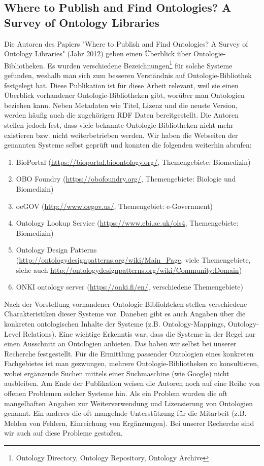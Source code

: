 \documentclass{article}
\begin{document}
\subsection{Where to Publish and Find Ontologies? A Survey of Ontology Libraries}

Die Autoren des Papiers "Where to Publish and Find Ontologies? A Survey of Ontology Libraries" \cite{d2012publish} (Jahr 2012) geben einen Überblick über Ontologie-Bibliotheken.
Es wurden verschiedene Bezeichnungen\footnote{Ontology Directory, Ontology Repository, Ontology Archive} für solche Systeme gefunden, weshalb man sich zum besseren Verständnis auf Ontologie-Bibliothek festgelegt hat.
Diese Publikation ist für diese Arbeit relevant, weil sie einen Überblick vorhandener Ontologie-Bibliotheken gibt, worüber man Ontologien beziehen kann.
Neben Metadaten wie Titel, Lizenz und die neuste Version, werden häufig auch die zugehörigen RDF Daten bereitgestellt.
Die Autoren stellen jedoch fest, dass viele bekannte Ontologie-Bibliotheken nicht mehr existieren bzw. nicht weiterbetrieben werden.
Wir haben die Webseiten der genannten Systeme selbst geprüft und konnten die folgenden weiterhin abrufen:

\begin{enumerate}
    \item BioPortal (\url{https://bioportal.bioontology.org/}, Themengebiete: Biomedizin)
    \item OBO Foundry (\url{https://obofoundry.org/}, Themengebiete: Biologie und Biomedizin)
    \item oeGOV (\url{http://www.oegov.us/}, Themengebiet: e-Government)
    \item Ontology Lookup Service (\url{https://www.ebi.ac.uk/ols4}, Themengebiete: Biomedizin)
    \item Ontology Design Patterns (\url{http://ontologydesignpatterns.org/wiki/Main\_Page}, viele Themengebiete, siehe auch \url{http://ontologydesignpatterns.org/wiki/Community:Domain})
    \item ONKI ontology server (\url{https://onki.fi/en/}, verschiedene Themengebiete)
\end{enumerate}

Nach der Vorstellung vorhandener Ontologie-Bibliohteken stellen verschiedene Charakteristiken dieser Systeme vor.
Daneben gibt es auch Angaben über die konkreten ontologischen Inhalte der Systeme (z.B. Ontology-Mappings, Ontology-Level Relations).
Eine wichtige Erkenntis war, dass die Systeme in der Regel nur einen Ausschnitt an Ontologien anbieten.
Das haben wir selbst bei unserer Recherche festgestellt.
Für die Ermittlung passender Ontologien eines konkreten Fachgebietes ist man gezwungen, mehrere Ontologie-Bibliotheken zu konsultieren, wobei ergänzende Suchen mittels einer Suchmaschine (wie Google) nicht ausbleiben.
Am Ende der Publikation weisen die Autoren noch auf eine Reihe von offenen Problemen solcher Systeme hin.
Als ein Problem wurden die oft mangelhaften Angaben zur Weiterverwendung und Lizensierung von Ontologien genannt.
Ein anderes die oft mangelnde Unterstützung für die Mitarbeit (z.B. Melden von Fehlern, Einreichung von Ergänzungen).
Bei unserer Recherche sind wir auch auf diese Probleme gestoßen.
\end{document}
